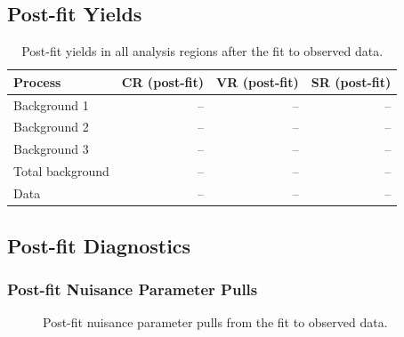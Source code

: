 \subsection{Post-fit Yields}
\label{sec:observed:yields}


\begin{table}[htbp]
  \centering
  \caption{Post-fit yields in all analysis regions after the fit to observed data.}
  \label{tab:postfit_yields}
  \begin{tabular}{lrrr}
    \toprule
    Process & CR (post-fit) & VR (post-fit) & SR (post-fit) \\
    \midrule
    Background 1  & -- & -- & -- \\
    Background 2  & -- & -- & -- \\
    Background 3  & -- & -- & -- \\
    \midrule
    Total background & -- & -- & -- \\
    Data             & -- & -- & -- \\
    \bottomrule
  \end{tabular}
\end{table}

\subsection{Post-fit Diagnostics}
\label{sec:observed:diagnostics}


\subsubsection{Post-fit Nuisance Parameter Pulls}


\begin{figure}[htbp]
  \centering
  \caption{Post-fit nuisance parameter pulls from the fit to observed data.}
  \label{fig:np_pulls_observed}
\end{figure}

